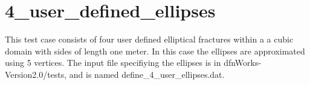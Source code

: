 \documentclass[letterpaper,10pt,english]{sphinxmanual}
\begin{document}
\section{4\_user\_defined\_ellipses}
\label{examples:user-defined-ellipses}
This test case consists of four user defined elliptical fractures within a a cubic domain with sides of length one meter. In this case the ellipses are approximated using 5 vertices. The input file specifiying the ellipses is in dfnWorks-Version2.0/tests, and is named define\_4\_user\_ellipses.dat.

{\hfill{}\hfill}

\begin{DUlineblock}{0em}
\item[] 
\item[] 
\end{DUlineblock}

{\hfill{}\hfill}

\begin{DUlineblock}{0em}
\item[] 
\item[] 
\end{DUlineblock}

{\hfill{}\hfill}
\end{document}
